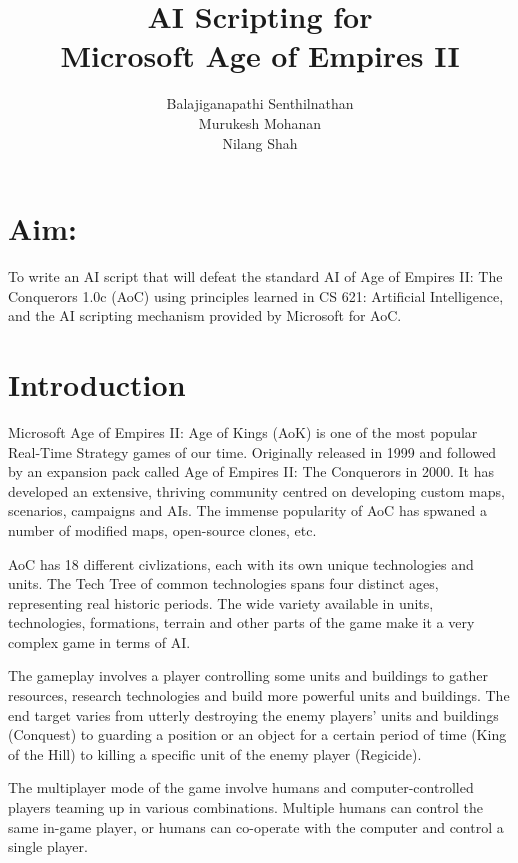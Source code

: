 \documentclass[a4paper,12pt]{article}
\title{AI Scripting for \\Microsoft{\small \texttrademark} Age of Empires II{\small \texttrademark}}
\author{Balajiganapathi Senthilnathan\\Murukesh Mohanan\\Nilang Shah}
\begin{document}
\maketitle
\section*{Aim:}
To write an AI script that will defeat the standard AI of Age of Empires II: The Conquerors 1.0c (AoC) 
using principles learned in CS 621: Artificial Intelligence, and the AI scripting mechanism provided by 
Microsoft for AoC.
\section*{Introduction}
Microsoft{\small \texttrademark} Age of Empires II: Age of Kings{\small \texttrademark} (AoK) is 
one of the most popular Real-Time Strategy games of our time. Originally released in 1999 and followed
by an expansion pack called Age of Empires II: The Conquerors{\small \texttrademark}
in 2000. It has developed an extensive, thriving community centred on developing custom maps, 
scenarios, campaigns and AIs. The immense popularity of AoC has spwaned a number of modified maps, 
open-source clones, etc.

AoC has 18 different civlizations, each with its own unique technologies and units. The Tech Tree of 
common technologies spans four distinct ages, representing real historic periods.  The wide variety 
available in units, technologies, formations, terrain and other parts of the game make it a very complex 
game in terms of AI.

The gameplay involves a player controlling some units and buildings to gather resources, research 
technologies and build more powerful units and buildings. The end target varies from utterly destroying
the enemy players' units and buildings (Conquest) to guarding a position or an object for a certain 
period of time (King of the Hill) to killing a specific unit of the enemy player (Regicide). 

The multiplayer mode of the game involve humans and computer-controlled players teaming up in various
combinations. Multiple humans can control the same in-game player, or humans can co-operate with
the computer and control a single player.
\end{document}
